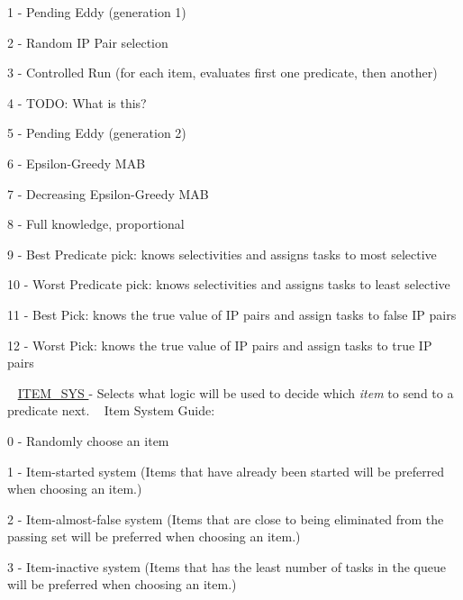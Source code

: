 \begin{DoxyItemize}
\item 1 -\/ Pending Eddy (generation 1)
\item 2 -\/ Random IP Pair selection
\item 3 -\/ Controlled Run (for each item, evaluates first one predicate, then another)
\item 4 -\/ T\+O\+DO\+: What is this?
\item 5 -\/ Pending Eddy (generation 2)
\item 6 -\/ Epsilon-\/\+Greedy M\+AB
\item 7 -\/ Decreasing Epsilon-\/\+Greedy M\+AB
\item 8 -\/ Full knowledge, proportional
\item 9 -\/ Best Predicate pick\+: knows selectivities and assigns tasks to most selective
\item 10 -\/ Worst Predicate pick\+: knows selectivities and assigns tasks to least selective
\item 11 -\/ Best Pick\+: knows the true value of IP pairs and assign tasks to false IP pairs
\item 12 -\/ Worst Pick\+: knows the true value of IP pairs and assign tasks to true IP pairs
\end{DoxyItemize}

~\newline
\hyperlink{namespacedynamicfilterapp_1_1toggles_ae8b7db6fd373a0c3225ad361f894aee2}{I\+T\+E\+M\+\_\+\+S\+YS } -\/ Selects what logic will be used to decide which {\itshape item} to send to a predicate next. ~\newline
Item System Guide\+:
\begin{DoxyItemize}
\item 0 -\/ Randomly choose an item
\item 1 -\/ Item-\/started system (Items that have already been started will be preferred when choosing an item.)
\item 2 -\/ Item-\/almost-\/false system (Items that are close to being eliminated from the passing set will be preferred when choosing an item.)
\item 3 -\/ Item-\/inactive system (Items that has the least number of tasks in the queue will be preferred when choosing an item.)
\end{DoxyItemize}

